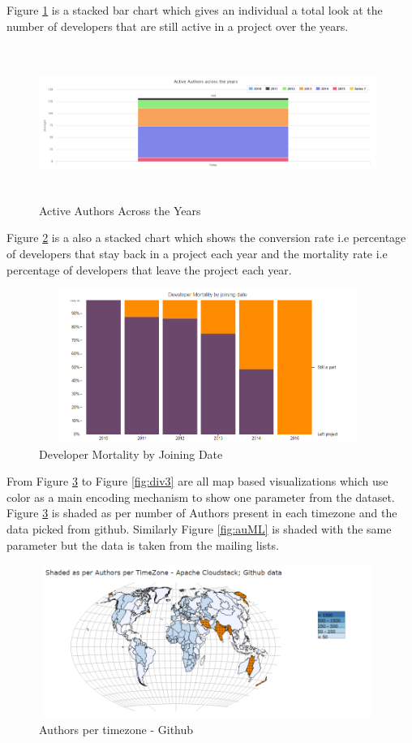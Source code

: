 \documentclass[seploa]{beavtex}
\begin{document}
Figure \ref{fig:actAuth} is a stacked bar chart which gives an individual a total look at the number of developers that are still active in a project over the years.

\begin{figure}[H]
\centering
\includegraphics[width=110mm,height=50mm]{image2.PNG}
\caption{Active Authors Across the Years}
\label{fig:actAuth}
\end{figure}

Figure \ref{fig:devMort} is a also a stacked chart which shows the conversion rate i.e percentage of developers that stay back in a project each year and the mortality rate i.e percentage of developers that leave the project each year.

\begin{figure}[H]
\centering
\includegraphics[width=110mm,height=50mm]{image3.PNG}
\caption{Developer Mortality by Joining Date}
\label{fig:devMort}
\end{figure}

From Figure \ref{fig:auHub} to Figure \ref{fig:div3} are all map based visualizations which use color as a main encoding mechanism to show one parameter from the dataset. Figure \ref{fig:auHub} is shaded as per number of Authors present in each timezone and the data picked from github. Similarly Figure \ref{fig:auML} is shaded with the same parameter but the data is taken from the mailing lists.

\begin{figure}[H]
\centering
\includegraphics[width=110mm,height=50mm]{image4.PNG}
\caption{Authors per timezone - Github}
\label{fig:auHub}
\end{figure}
\end{document}
